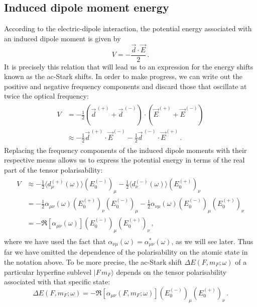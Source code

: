 \documentclass[../Thesis-IJspeert.tex]{subfiles}
\begin{document}
\subsection{Induced dipole moment energy}
According to the electric-dipole interaction, the potential energy associated with an induced dipole moment is given by
\begin{equation}
V = -\frac{\vec{d}\cdot \vec{E}}{2}\,.
\end{equation}
It is precisely this relation that will lead us to an expression for the energy shifts known as the ac-Stark shifts. In order to make progress, we can write out the positive and negative frequency components and discard those that oscillate at twice the optical frequency:
\begin{align}
\begin{split}
V &= -\frac{1}{2}\left( \vec{d}^{\,(+)} + \vec{d}^{\,(-)} \right) \cdot \left( \vec{E}^{(+)} + \vec{E}^{(-)} \right)\\ &\approx -\frac{1}{2} \vec{d}^{\,(+)}\cdot \vec{E}^{(-)} -\frac{1}{2} \vec{d}^{\,(-)} \cdot \vec{E}^{(+)}\,.
\end{split}
\end{align}
Replacing the frequency components of the induced dipole moments with their respective means allows us to express the potential energy in terms of the real part of the tensor polarisability:
\begin{align}
\begin{split}
V &\approx -\frac{1}{2} \langle d_\mu^{(+)}(\omega) \rangle ( E_0^{(-)} )_\mu  -\frac{1}{2} \langle d_\nu^{(-)}(\omega) \rangle ( E_0^{(+)} )_\nu \\&= -\frac{1}{2} \alpha_{\mu \nu}(\omega) ( E_0^{(+)} )_\nu ( E_0^{(-)} )_\mu -\frac{1}{2} \alpha_{\nu \mu}(\omega) ( E_0^{(-)} )_\mu ( E_0^{(+)} )_\nu \\ &= -\Re [ \alpha_{\mu \nu}(\omega) ] ( E_0^{(-)} )_\mu ( E_0^{(+)} )_\nu\,,
\end{split}
\end{align}
where we have used the fact that $\alpha_{\nu \mu}(\omega) = \alpha_{\mu \nu}^*(\omega)$, as we will see later. Thus far we have omitted the dependence of the polarisability on the atomic state in the notation above. To be more precise, the ac-Stark shift $\Delta E(F,m_F;\omega)$ of a particular hyperfine sublevel $\vert F\,m_F \rangle$ depends on the tensor polarisability associated with that specific state:
\begin{equation}
\label{StarkSummary}
	 \Delta E(F,m_F;\omega)=-\Re [ \alpha_{\mu \nu}(F,m_F;\omega) ] ( E_0^{(-)} )_\mu ( E_0^{(+)} )_\nu\,.
\end{equation}
\end{document}
